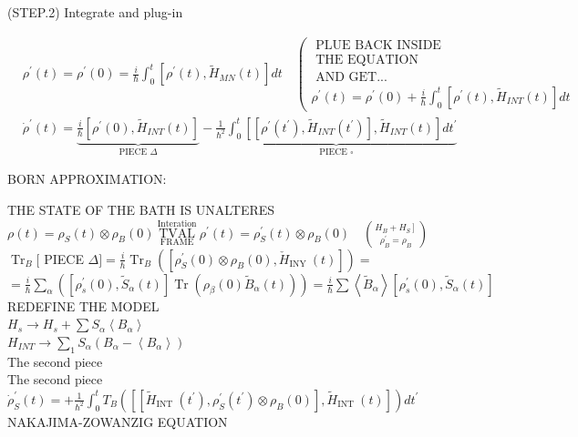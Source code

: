\documentclass[10pt]{article}
\begin{document}
(STEP.2) Integrate and plug-in

$$
\begin{aligned}
& \rho^{\prime}(t)=\rho^{\prime}(0)=\frac{i}{\hbar} \int_{0}^{t}\left[\rho^{\prime}(t), \tilde{H}_{M N}(t)\right] d t \quad\left(\begin{array}{c}
\text { PLUE BACK INSIDE } \\
\text { THE EQUATION } \\
\text { AND GET... } \\
\rho^{\prime}(t)=\rho^{\prime}(0)+\frac{i}{\hbar} \int_{0}^{t}\left[\rho^{\prime}(t), \tilde{H}_{I N T}(t)\right] d t
\end{array}\right. \\
& \dot{\rho}^{\prime}(t)=\underbrace{\frac{i}{\hbar}\left[\rho^{\prime}(0), \tilde{H}_{I N T}(t)\right]}_{\text {PIECE } \Delta}-\underbrace{\frac{1}{\hbar^{2}} \int_{0}^{t}\left[\left[\rho^{\prime}\left(t^{\prime}\right), \tilde{H}_{I N T}\left(t^{\prime}\right)\right], \tilde{H}_{I N T}(t)\right] d t^{\prime}}_{\text {PIECE } \square}
\end{aligned}
$$

BORN APPROXIMATION:

THE STATE OF THE BATH IS UNALTERES\\
$\rho(t)=\rho_{S}(t) \otimes \rho_{B}(0) \underset{\text { FRAME }}{\stackrel{\text { Interation }}{\text { TVAL }}} \rho^{\prime}(t)=\rho_{S}^{\prime}(t) \otimes \rho_{B}(0) \quad\binom{\left.H_{B}+H_{S}\right]}{\rho_{B}^{\prime}=\rho_{B}}$\\
$\operatorname{Tr}_{B}[$ PIECE $\Delta]=\frac{i}{\hbar} \operatorname{Tr}_{B}\left(\left[\rho_{S}^{\prime}(0) \otimes \rho_{B}(0), \check{H}_{\text {INY }}(t)\right]\right)=$\\
$=\frac{i}{\hbar} \sum_{\alpha}\left(\left[\rho_{s}^{\prime}(0), \tilde{S}_{\alpha}(t)\right] \operatorname{Tr}\left(\rho_{\beta}(0) \tilde{B}_{\alpha}(t)\right)\right)=\frac{i}{\hbar} \sum\left\langle\tilde{B}_{\alpha}\right\rangle\left[\rho_{s}^{\prime}(0), \tilde{S}_{\alpha}(t)\right]$\\
REDEFINE THE MODEL\\
$H_{s} \rightarrow H_{s}+\sum S_{\alpha}\left\langle B_{\alpha}\right\rangle$\\
$H_{I N T} \rightarrow \sum_{1} S_{\alpha}\left(B_{\alpha}-\left\langle B_{\alpha}\right\rangle\right)$\\
The second piece\\
The second piece\\
$\dot{\rho}_{S}^{\prime}(t)=+\frac{1}{\hbar^{2}} \int_{0}^{t} T_{B}\left(\left[\left[\tilde{H}_{\text {INT }}\left(t^{\prime}\right), \rho_{S}^{\prime}\left(t^{\prime}\right) \otimes \rho_{B}(0)\right], \tilde{H}_{\text {INT }}(t)\right]\right) d t^{\prime}$ NAKAJIMA-ZOWANZIG EQUATION
\end{document}
